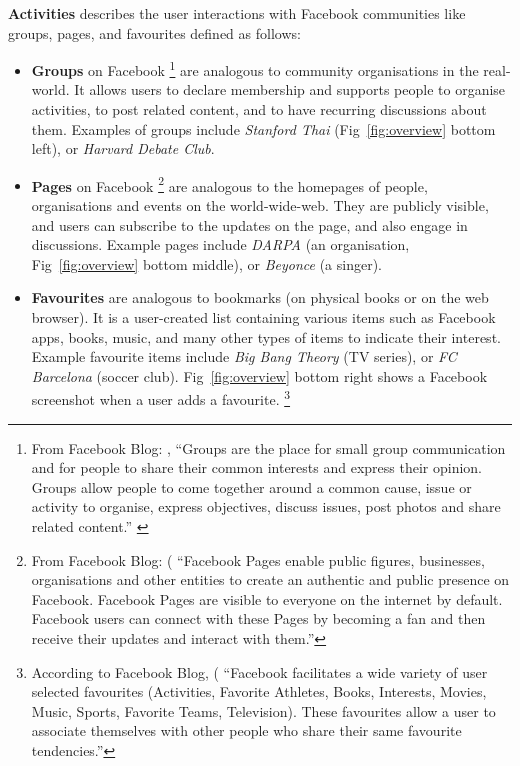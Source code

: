 {\bf Activities} describes the user interactions with Facebook
communities like groups, pages, and favourites defined as follows:
\begin{itemize}
  \item \textbf{Groups} on Facebook 
\footnote{From Facebook Blog: 
, ``Groups are the place for small group communication and for people to share their common interests and express their opinion. Groups allow people to come together around a common cause, issue or activity to organise, express objectives, discuss issues, post photos and share related content.'' 
\label{fn:fbblog}}
are analogous to community organisations in the real-world. It allows
  users to declare membership and supports people to organise
  activities, to post related content, and to have recurring
  discussions about them.  Examples of groups include {\em Stanford
  Thai} (Fig~\ref{fig:overview} bottom left), or {\em Harvard Debate
  Club}.  \item \textbf{Pages} on Facebook \footnote{From Facebook
  Blog:
  (
  ``Facebook Pages enable public figures, businesses, organisations
  and other entities to create an authentic and public presence on
  Facebook. Facebook Pages are visible to everyone on the internet by
  default. Facebook users can connect with these Pages by becoming a
  fan and then receive their updates and interact with them.'' }
  are analogous to the homepages of people, organisations and events
  on the world-wide-web. They are publicly visible, and users can
  subscribe to the updates on the page, and also engage in
  discussions. Example pages include {\em DARPA} (an organisation,
  Fig~\ref{fig:overview} bottom middle), or {\em Beyonce} (a singer).

  \item \textbf{Favourites} are analogous to bookmarks (on physical
  books or on the web browser). It is a user-created list containing
  various items such as Facebook apps, books, music, and many other
  types of items to indicate their interest. Example favourite items
  include {\em Big Bang Theory} (TV series), or {\em FC Barcelona}
  (soccer club). Fig~\ref{fig:overview} bottom right shows a Facebook
  screenshot when a user adds a favourite.  \footnote{According to
  Facebook Blog, (
  ``Facebook facilitates a wide variety of user selected favourites
  (Activities, Favorite Athletes, Books, Interests, Movies, Music,
  Sports, Favorite Teams, Television). These favourites allow a user
  to associate themselves with other people who share their same
  favourite tendencies.''}
\end{itemize} 

